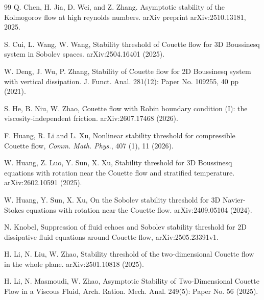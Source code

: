 \documentclass[12pt]{article}
\numberwithin{equation}{section}
\begin{document}
\begin{thebibliography}{99}
  		Q. Chen, H. Jia, D. Wei, and Z. Zhang. Asymptotic stability of the Kolmogorov flow at high	reynolds numbers. arXiv preprint arXiv:2510.13181, 2025.
  		
  		S. Cui, L. Wang, W. Wang, Stability threshold of Couette flow for 3D Boussinesq system in Sobolev spaces. arXiv:2504.16401 (2025).
  		
  		W. Deng, J. Wu, P. Zhang, Stability of Couette flow for 2D Boussinesq system with vertical dissipation. J. Funct. Anal. 281(12): Paper No. 109255, 40 pp (2021).
  		
  		
  		S. He, B. Niu, W. Zhao, Couette flow with Robin boundary condition (I): the viscosity-independent friction. arXiv:2607.17468 (2026).
  		
  		F. Huang, R. Li and L. Xu,
  		Nonlinear stability threshold for compressible Couette flow,
  		\textit{Comm. Math. Phys.}, 407 (1), 11 (2026).
  		  		
  		W. Huang, Z. Luo, Y. Sun, X. Xu, Stability threshold for 3D Boussinesq equations with rotation near the Couette flow and stratified temperature. arXiv:2602.10591 (2025).
  		
  		W. Huang, Y. Sun, X. Xu, On the Sobolev stability threshold for 3D Navier-Stokes equations with rotation near the Couette flow. arXiv:2409.05104 (2024).
  		
  		
  		
  		 N. Knobel, Suppression of fluid echoes and Sobolev stability threshold for 2D dissipative fluid equations around Couette flow, arXiv:2505.23391v1.
  		
  		
  		H. Li, N. Liu, W. Zhao, Stability threshold of the two-dimensional Couette flow in the whole plane. arXiv:2501.10818 (2025).
  		
  		H. Li, N. Masmoudi, W. Zhao, Asymptotic Stability of Two-Dimensional Couette Flow in a Viscous Fluid, Arch. Ration. Mech. Anal. 249(5): Paper No. 56 (2025).
  		

\end{thebibliography}
\end{document}
